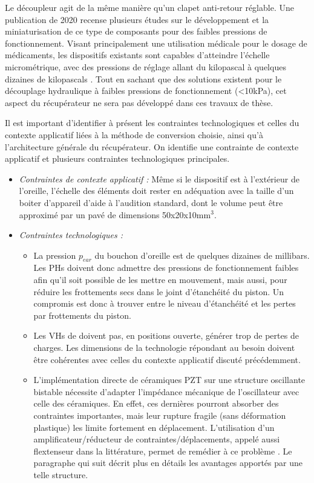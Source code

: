 Le découpleur agit de la même manière qu'un clapet anti-retour réglable. Une publication de 2020 recense plusieurs études sur le développement et la miniaturisation de ce type de composants pour des faibles pressions de fonctionnement. Visant principalement une utilisation médicale pour le dosage de médicaments, les dispositifs existants sont capables d'atteindre l'échelle micrométrique, avec des pressions de réglage allant du kilopascal à quelques dizaines de kilopascals \cite{Wang2020}. Tout en sachant que des solutions existent pour le découplage hydraulique à faibles pressions de fonctionnement (<10kPa), cet aspect du récupérateur ne sera pas développé dans ces travaux de thèse.

Il est important d'identifier à présent les contraintes technologiques et celles du contexte applicatif liées à la méthode de conversion choisie, ainsi qu'à l'architecture générale du récupérateur. On identifie une contrainte de contexte applicatif et plusieurs contraintes technologiques principales.
\begin{itemize}[label=$\blacksquare$]
\item \emph{Contraintes de contexte applicatif :} Même si le dispositif est à l'extérieur de l'oreille, l'échelle des éléments doit rester en adéquation avec la taille d'un boiter d'appareil d'aide à l'audition standard, dont le volume peut être approximé par un pavé de dimensions 50x20x10mm$^3$.
\item \emph{Contraintes technologiques :}
	\begin{itemize}[label=$\circ$]
		\item La pression $p_{ear}$ du bouchon d'oreille est de quelques dizaines de millibars. Les PHs doivent donc admettre des pressions de fonctionnement faibles afin qu'il soit possible de les mettre en mouvement, mais aussi, pour réduire les frottements secs dans le joint d'étanchéité du piston. Un compromis est donc à trouver entre le niveau d'étanchéité et les pertes par frottements du piston.
		\item Les VHs de doivent pas, en positions ouverte, générer trop de pertes de charges. Les dimensions de la technologie répondant au besoin doivent être cohérentes avec celles du contexte applicatif discuté précédemment.
		\item L'implémentation directe de céramiques PZT sur une structure oscillante bistable nécessite d'adapter l'impédance mécanique de l'oscillateur avec celle des céramiques. En effet, ces dernières pourront absorber des contraintes importantes, mais leur rupture fragile (sans déformation plastique) les limite fortement en déplacement. L'utilisation d'un amplificateur/réducteur de contraintes/déplacements, appelé aussi flextenseur dans la littérature, permet de remédier à ce problème \cite{Snyder2007,Guo2019,Aldrich1994,Zhou2013}. Le paragraphe qui suit décrit plus en détails les avantages apportés par une telle structure.
	\end{itemize}
\end{itemize}
